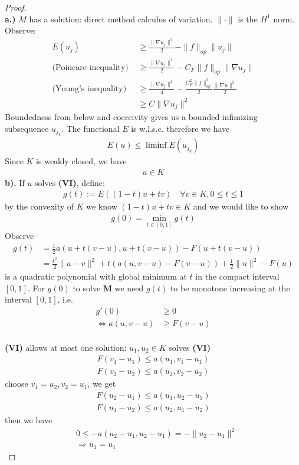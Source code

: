 \documentclass[a4paper,12pt,oneside,fleqn]{book}
\theoremstyle{definition}
\theoremstyle{remark}
\begin{document}
\begin{proof}\quad\\
	\textbf{a.) }$M$ has a solution: direct method calculus of variation. $\|\cdot\|$ is the $H^1$ norm. Observe:
	\begin{align*}
		E(u_j) &\geq \frac{\|\nabla u_j\|^2}{2} - \|f\|_{op}\| u_j\|\\
		(\text{Poincare inequality) }
		&\ge \frac{\|\nabla u_j\|^2}{2} - C_F \|f\|_{op} \|\nabla u_j\|\\
		\text{(Young's inequality)}
		& \ge \frac{\|\nabla u_j\|^2}{4} - \frac{C_F^2 \|f\|_{op}^2}{2} \frac{\|\nabla u\|^2}{2}\\
		&\geq C\|\nabla u_j\|^2
	\end{align*}
	Boundedness from below and coercivity gives us a bounded infimizing subsequence $u_{j_k}$. The functional $E$ is w.l.s.c. therefore we have
	\begin{align*}
		E(u) \le \liminf E(u_{j_k})
	\end{align*}
	Since $K$ is weakly closed, we have 
	\begin{align*}
		 u \in K
	\end{align*}
	\textbf{b). }If $u$ solves \textbf{(VI)}, define:
	\begin{align*}
		g(t):= E((1- t)u + tv) \quad \forall v \in K, 0 \le t \le 1
	\end{align*}
	by the convexity of $K$ we know $(1-t) u + t v \in K$ and we would like to show
	\begin{align*}
		g(0) = \min_{t \in [0, 1]} g(t)
	\end{align*}
	Observe
	\begin{align*}
		g(t) &= \frac{1}{2}a(u + t(v - u), u + t(v - u)) - F(u + t(v - u))\\
			 &= \frac{t^2}{2}\|u - v\|^2 + t (a(u, v - u) - F(v - u)) + \frac{1}{2}\|u\|^2 - F(u)
	\end{align*}
	is a quadratic polynomial with global minimum at $t$ in the compact interval $[0, 1]$. For $g(0)$ to solve \textbf{M} we need $g(t)$ to be monotone increasing at the interval $[0, 1]$, i.e.
	\begin{align*}
		g'(0) &\ge 0\\
		\Leftrightarrow
		a(u, v - u) &\geq F(v - u)
	\end{align*}\\
	\textbf{(VI)} allows at most one solution: $u_1, u_2 \in K$ solves\textbf{ (VI)}
	\begin{align*}
		F(v_1 - u_1) \le a(u_1, v_1 - u_1)\\
		F(v_2 - u_2) \le a(u_2, v_2 - u_2)
	\end{align*}
	choose $v_1 = u_2, v_2 = u_1$, we get 
	\begin{align*}
		F(u_2 - u_1) \le a(u_1, u_2 - u_1)\\
		F(u_1 - u_2) \le a(u_2, u_1 - u_2)		
	\end{align*}
	then we have
	\begin{align*}
		&0 \le -a (u_2 - u_1, u_2 - u_1) = - \|u_2 - u_1\|^2\\
		&\Rightarrow u_1 = u_1
	\end{align*}

\end{proof}
\end{document}
